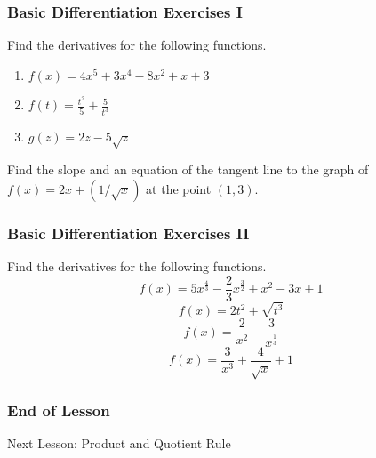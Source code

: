\documentclass[xcolor=dvipsnames]{beamer}
\begin{document}
\begin{frame}
  \frametitle{Basic Differentiation Exercises I}
Find the derivatives for the following functions.
\begin{enumerate}
\item $f(x)=4x^{5}+3x^{4}-8x^{2}+x+3$
\item $f(t)=\frac{t^{2}}{5}+\frac{5}{t^{3}}$
\item $g(z)=2z-5\sqrt{z}$
\end{enumerate}

\bigskip

Find the slope and an equation of the tangent line to the graph of
$f(x)=2x+(1/\sqrt{x})$ at the point $(1,3)$.
\end{frame}

\begin{frame}
  \frametitle{Basic Differentiation Exercises II}
Find the derivatives for the following functions.
\begin{equation}
  \label{eq:ohzahcer}
  f(x)=5x^{\frac{4}{3}}-\frac{2}{3}x^{\frac{3}{2}}+x^{2}-3x+1
\end{equation}
\begin{equation}
  \label{eq:mothoofi}
f(x)=2t^{2}+\sqrt{t^{3}}
\end{equation}
\begin{equation}
  \label{eq:aiquooyo}
  f(x)=\frac{2}{x^{2}}-\frac{3}{x^{\frac{1}{3}}}
\end{equation}
\begin{equation}
  \label{eq:achaingo}
f(x)=\frac{3}{x^{3}}+\frac{4}{\sqrt{x}}+1
\end{equation}
\end{frame}

\begin{frame}
  \frametitle{End of Lesson}
Next Lesson: Product and Quotient Rule
\end{frame}
\end{document}
